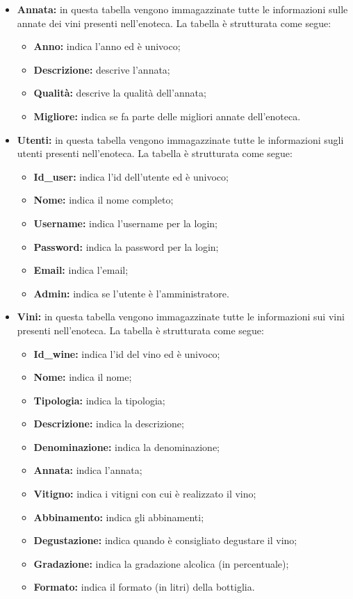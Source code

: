 \begin{itemize}
	\item \textbf{Annata:} in questa tabella vengono immagazzinate tutte le
	informazioni sulle annate dei vini presenti nell'enoteca. La tabella è strutturata come segue:
	\begin{itemize}
		\item \textbf{Anno:} indica l'anno ed è univoco;
		\item \textbf{Descrizione:} descrive l'annata;
		\item \textbf{Qualità:} descrive la qualità dell'annata;
		\item \textbf{Migliore:} indica se fa parte delle migliori annate dell'enoteca.
	\end{itemize}	
	\item \textbf{Utenti:} in questa tabella vengono immagazzinate tutte le informazioni sugli utenti presenti nell'enoteca. La tabella è strutturata come segue:
	\begin{itemize}
		\item \textbf{Id\_user:} indica l'id dell'utente ed è univoco;
		\item \textbf{Nome:} indica il nome completo;
		\item \textbf{Username:} indica l'username per la login;
		\item \textbf{Password:} indica la password per la login;
		\item \textbf{Email:} indica l'email;
		\item \textbf{Admin:} indica se l'utente è l'amministratore.
	\end{itemize}
	\item \textbf{Vini:} in questa tabella vengono immagazzinate tutte le informazioni sui vini presenti nell'enoteca. La tabella è strutturata come segue:
	\begin{itemize}
		\item \textbf{Id\_wine:} indica l'id del vino ed è univoco;
		\item \textbf{Nome:} indica il nome;
		\item \textbf{Tipologia:} indica la tipologia;
		\item \textbf{Descrizione:} indica la descrizione;
		\item \textbf{Denominazione:} indica la denominazione;
		\item \textbf{Annata:} indica l'annata;
		\item \textbf{Vitigno:} indica i vitigni con cui è realizzato il vino;
		\item \textbf{Abbinamento:} indica gli abbinamenti;
		\item \textbf{Degustazione:} indica quando è consigliato degustare il vino;
		\item \textbf{Gradazione:} indica la gradazione alcolica (in percentuale);
		\item \textbf{Formato:} indica il formato (in litri) della bottiglia.
	\end{itemize}
\end{itemize}

